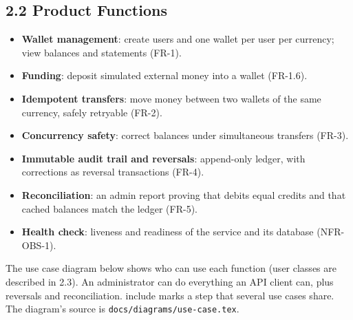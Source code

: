 \documentclass[11pt,a4paper]{article}
\providecommand{\tightlist}{\setlength{\itemsep}{2pt}\setlength{\parskip}{0pt}}
\begin{document}
\subsection{2.2 Product Functions}\label{product-functions}

\begin{itemize}
\tightlist
\item
  \textbf{Wallet management}: create users and one wallet per user per currency; view balances and
  statements (FR-1).
\item
  \textbf{Funding}: deposit simulated external money into a wallet (FR-1.6).
\item
  \textbf{Idempotent transfers}: move money between two wallets of the same currency, safely retryable
  (FR-2).
\item
  \textbf{Concurrency safety}: correct balances under simultaneous transfers (FR-3).
\item
  \textbf{Immutable audit trail and reversals}: append-only ledger, with corrections as reversal
  transactions (FR-4).
\item
  \textbf{Reconciliation}: an admin report proving that debits equal credits and that cached balances
  match the ledger (FR-5).
\item
  \textbf{Health check}: liveness and readiness of the service and its database (NFR-OBS-1).
\end{itemize}

The use case diagram below shows who can use each function (user classes are described in 2.3).
An administrator can do everything an API client can, plus reversals and reconciliation.
\guillemotleft{}include\guillemotright{} marks a step that several use cases share. The diagram's source is
\texttt{docs/\allowbreak{}diagrams/\allowbreak{}use-case.tex}.
\end{document}
